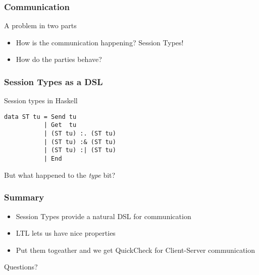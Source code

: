 \documentclass{beamer}
\begin{document}
\begin{frame}
    \frametitle{Communication}
    \Large{A problem in two parts}
    \begin{itemize}
        \item How is the communication happening? Session Types!
        \item How do the parties behave?
    \end{itemize}
\end{frame}

\begin{frame}[fragile]
    \frametitle{Session Types as a DSL}
    \large{Session types in Haskell}
    \\
    \begin{verbatim}
data ST tu = Send tu
           | Get  tu
           | (ST tu) :. (ST tu)
           | (ST tu) :& (ST tu)
           | (ST tu) :| (ST tu)
           | End
    \end{verbatim}
    \pause
    But what happened to the \textit{type} bit?
\end{frame}

\begin{frame}
    \frametitle{Summary}
    \begin{itemize}
        \item Session Types provide a natural DSL for communication
        \item LTL lets us have nice properties
        \item Put them togeather and we get QuickCheck for Client-Server communication
    \end{itemize}
\end{frame}

\begin{frame}
    \Huge{\centerline{Questions?}}
\end{frame}
\end{document}
